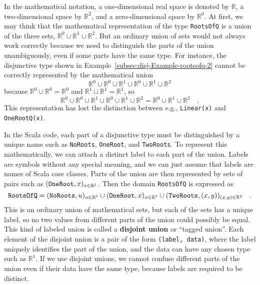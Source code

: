 In the mathematical notation, a one-dimensional real space is denoted
by $\mathbb{R}$, a two-dimensional space by $\mathbb{R}^{2}$, and
a zero-dimensional space by $\mathbb{R}^{0}$. At first, we may think
that the mathematical representation of the type \lstinline!RootsOfQ!
is a union of the three sets, $\mathbb{R}^{0}\cup\mathbb{R}^{1}\cup\mathbb{R}^{2}$.
But an ordinary union of sets would not always work correctly because
we need to distinguish the parts of the union unambiguously, even
if some parts have the same type. For instance, the disjunctive type
shown in Example~\ref{subsec:disj-Example-rootsofq-2} cannot be
correctly represented by the mathematical union
\[
\mathbb{R}^{0}\cup\mathbb{R}^{0}\cup\mathbb{R}^{1}\cup\mathbb{R}^{0}\cup\mathbb{R}^{1}\cup\mathbb{R}^{2}
\]
because $\mathbb{R}^{0}\cup\mathbb{R}^{0}=\mathbb{R}^{0}$ and $\mathbb{R}^{1}\cup\mathbb{R}^{1}=\mathbb{R}^{1}$,
so 
\[
\mathbb{R}^{0}\cup\mathbb{R}^{0}\cup\mathbb{R}^{1}\cup\mathbb{R}^{0}\cup\mathbb{R}^{1}\cup\mathbb{R}^{2}=\mathbb{R}^{0}\cup\mathbb{R}^{1}\cup\mathbb{R}^{2}\quad.
\]
This representation has lost the distinction between e.g., \lstinline!Linear(x)!
and \lstinline!OneRootQ(x)!.

In the Scala code, each part of a disjunctive type must be distinguished
by a unique name such as \lstinline!NoRoots!, \lstinline!OneRoot!,
and \lstinline!TwoRoots!. To represent this mathematically, we can
attach a distinct label to each part of the union. Labels are symbols
without any special meaning, and we can just assume that labels are
names of Scala case classes. Parts of the union are then represented
by sets of pairs such as $(\text{\texttt{OneRoot}},x)_{x\in\mathbb{R}^{1}}$.
Then the domain \lstinline!RootsOfQ! is expressed as
\[
\text{\texttt{RootsOfQ}}=(\text{\texttt{NoRoots}},u)_{u\in\mathbb{R}^{0}}\cup(\text{\texttt{OneRoot}},x)_{x\in\mathbb{R}^{1}}\cup(\text{\texttt{TwoRoots}},\left(x,y\right))_{\left(x,y\right)\in\mathbb{R}^{2}}\quad.
\]
This is an ordinary union of mathematical sets, but each of the sets
has a unique label, so no two values from different parts of the union
could possibly be equal. This kind of labeled union is called a \textbf{disjoint
union} or ``tagged union''. Each element of the disjoint union is
a pair of the form \lstinline!(label, data)!, where the label uniquely
identifies the part of the union, and the data can have any chosen
type such as $\mathbb{R}^{1}$. If we use disjoint unions, we cannot
confuse different parts of the union even if their data have the same
type, because labels are required to be distinct.

